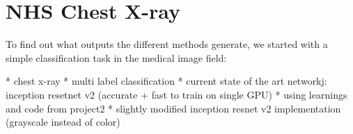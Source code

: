 \chapter{NHS Chest X-ray}
To find out what outputs the different methods generate, we started with a simple classification task in the medical image field:

* chest x-ray
* multi label classification
* current state of the art networkj: inception  resetnet v2 (accurate + fast to train on single GPU)
* using learnings and code from project2
* slightly modified inception resnet v2 implementation (grayscale instead of color)